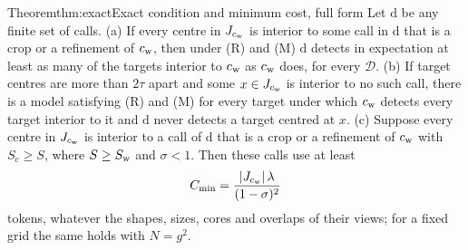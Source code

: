 \begin{restate}{Theorem}{thm:exact}{Exact condition and minimum cost, full form}
Let $\mathrm{d}$ be any finite set of calls. (a) If every centre in $J_{c_{\mathrm{w}}}$ is interior to some call in $\mathrm{d}$ that is a crop or a refinement of $c_{\mathrm{w}}$, then under (R) and (M) $\mathrm{d}$ detects in expectation at least as many of the targets interior to $c_{\mathrm{w}}$ as $c_{\mathrm{w}}$ does, for every $\mathcal{D}$. (b) If target centres are more than $2\tau$ apart and some $x \in J_{c_{\mathrm{w}}}$ is interior to no such call, there is a model satisfying (R) and (M) for every target under which $c_{\mathrm{w}}$ detects every target interior to it and $\mathrm{d}$ never detects a target centred at $x$. (c) Suppose every centre in $J_{c_{\mathrm{w}}}$ is interior to a call of $\mathrm{d}$ that is a crop or a refinement of $c_{\mathrm{w}}$ with $S_c \ge S$, where $S \ge S_{\mathrm{w}}$ and $\sigma < 1$. Then these calls use at least
\[
C_{\min} = \frac{|J_{c_{\mathrm{w}}}|\,\lambda}{(1 - \sigma)^2}
\]
tokens, whatever the shapes, sizes, cores and overlaps of their views; for a fixed grid the same holds with $N = g^2$.
\end{restate}

